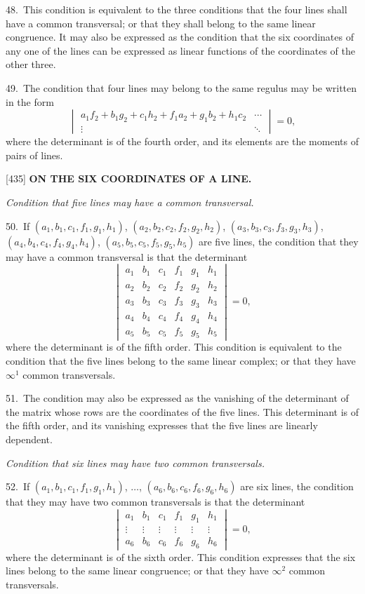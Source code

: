 \documentclass[12pt,a4paper]{article}
\newcommand{\paperref}[1]{\textup{[#1]}}
\theoremstyle{definition}
\begin{document}
48.~This condition is equivalent to the three conditions that the four lines shall have a common transversal; or that they shall belong to the same linear congruence. It may also be expressed as the condition that the six coordinates of any one of the lines can be expressed as linear functions of the coordinates of the other three.

49.~The condition that four lines may belong to the same regulus may be written in the form
\[
\begin{vmatrix}
a_1 f_2 + b_1 g_2 + c_1 h_2 + f_1 a_2 + g_1 b_2 + h_1 c_2 & \cdots \\ \vdots & \ddots
\end{vmatrix}
= 0,
\]
where the determinant is of the fourth order, and its elements are the moments of pairs of lines.

\newpage
\setcounter{page}{85}

\noindent\paperref{435}\quad
\textbf{ON THE SIX COORDINATES OF A LINE.}

\textit{Condition that five lines may have a common transversal.}

50.~If $(a_1, b_1, c_1, f_1, g_1, h_1)$, $(a_2, b_2, c_2, f_2, g_2, h_2)$, $(a_3, b_3, c_3, f_3, g_3, h_3)$, $(a_4, b_4, c_4, f_4, g_4, h_4)$, $(a_5, b_5, c_5, f_5, g_5, h_5)$ are five lines, the condition that they may have a common transversal is that the determinant
\[
\begin{vmatrix}
a_1 & b_1 & c_1 & f_1 & g_1 & h_1 \\
a_2 & b_2 & c_2 & f_2 & g_2 & h_2 \\
a_3 & b_3 & c_3 & f_3 & g_3 & h_3 \\
a_4 & b_4 & c_4 & f_4 & g_4 & h_4 \\
a_5 & b_5 & c_5 & f_5 & g_5 & h_5
\end{vmatrix}
= 0,
\]
where the determinant is of the fifth order. This condition is equivalent to the condition that the five lines belong to the same linear complex; or that they have $\infty^1$ common transversals.

51.~The condition may also be expressed as the vanishing of the determinant of the matrix whose rows are the coordinates of the five lines. This determinant is of the fifth order, and its vanishing expresses that the five lines are linearly dependent.

\textit{Condition that six lines may have two common transversals.}

52.~If $(a_1, b_1, c_1, f_1, g_1, h_1)$, $\ldots$, $(a_6, b_6, c_6, f_6, g_6, h_6)$ are six lines, the condition that they may have two common transversals is that the determinant
\[
\begin{vmatrix}
a_1 & b_1 & c_1 & f_1 & g_1 & h_1 \\
\vdots & \vdots & \vdots & \vdots & \vdots & \vdots \\
a_6 & b_6 & c_6 & f_6 & g_6 & h_6
\end{vmatrix}
= 0,
\]
where the determinant is of the sixth order. This condition expresses that the six lines belong to the same linear congruence; or that they have $\infty^2$ common transversals.
\end{document}

